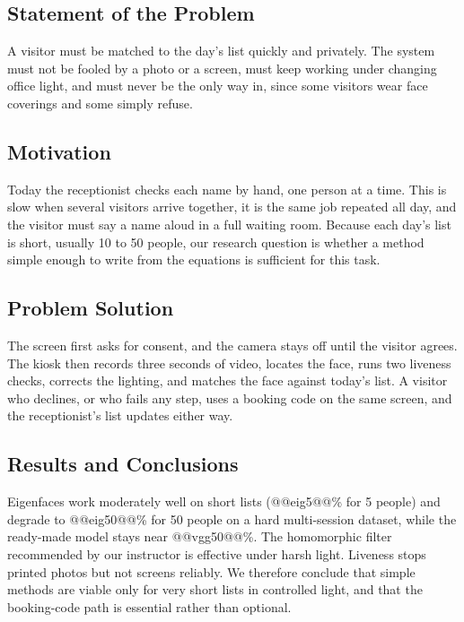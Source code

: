 \documentclass[conference,a4paper]{IEEEtran}
\begin{document}
\subsection{Statement of the Problem}
A visitor must be matched to the day's list quickly and privately. The system must not be fooled by a photo or a screen, must keep working under changing office light, and must never be the only way in, since some visitors wear face coverings and some simply refuse.

\subsection{Motivation}
Today the receptionist checks each name by hand, one person at a time. This is slow when several visitors arrive together, it is the same job repeated all day, and the visitor must say a name aloud in a full waiting room. Because each day's list is short, usually 10 to 50 people, our research question is whether a method simple enough to write from the equations is sufficient for this task.

\subsection{Problem Solution}
The screen first asks for consent, and the camera stays off until the visitor agrees. The kiosk then records three seconds of video, locates the face, runs two liveness checks, corrects the lighting, and matches the face against today's list. A visitor who declines, or who fails any step, uses a booking code on the same screen, and the receptionist's list updates either way.

\subsection{Results and Conclusions}
Eigenfaces work moderately well on short lists (@@eig5@@\% for 5 people) and degrade to @@eig50@@\% for 50 people on a hard multi-session dataset, while the ready-made model stays near @@vgg50@@\%. The homomorphic filter recommended by our instructor is effective under harsh light. Liveness stops printed photos but not screens reliably. We therefore conclude that simple methods are viable only for very short lists in controlled light, and that the booking-code path is essential rather than optional.
\end{document}
